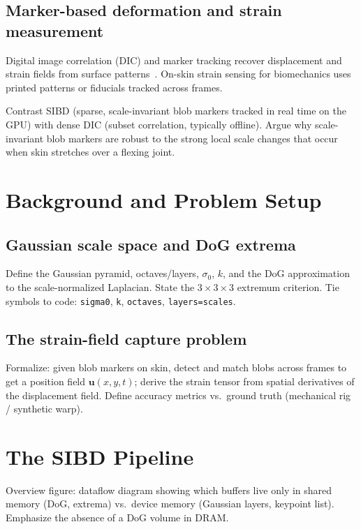 \subsection{Marker-based deformation and strain measurement}
Digital image correlation (DIC) and marker tracking recover displacement and
strain fields from surface patterns~\cite{dic}. On-skin strain sensing for
biomechanics uses printed patterns or fiducials tracked across frames.
\begin{fillbox}
Contrast SIBD (sparse, scale-invariant blob markers tracked in real time on the
GPU) with dense DIC (subset correlation, typically offline). Argue why
scale-invariant blob markers are robust to the strong local scale changes that
occur when skin stretches over a flexing joint.
\end{fillbox}

\section{Background and Problem Setup}
\label{sec:background}
\subsection{Gaussian scale space and DoG extrema}
\begin{fillbox}
Define the Gaussian pyramid, octaves/layers, $\sigma_0$, $k$, and the DoG
approximation to the scale-normalized Laplacian. State the $3\times3\times3$
extremum criterion. Tie symbols to code: \texttt{sigma0}, \texttt{k},
\texttt{octaves}, \texttt{layers=scales}.
\end{fillbox}

\subsection{The strain-field capture problem}
\begin{fillbox}
Formalize: given blob markers on skin, detect and match blobs across frames to
get a position field $\mathbf{u}(x,y,t)$; derive the strain tensor from spatial
derivatives of the displacement field. Define accuracy metrics vs.\ ground
truth (mechanical rig / synthetic warp).
\end{fillbox}

\section{The SIBD Pipeline}
\label{sec:pipeline}
\begin{fillbox}
Overview figure: dataflow diagram showing which buffers live only in shared
memory (DoG, extrema) vs.\ device memory (Gaussian layers, keypoint list).
Emphasize the absence of a DoG volume in DRAM.
\end{fillbox}

